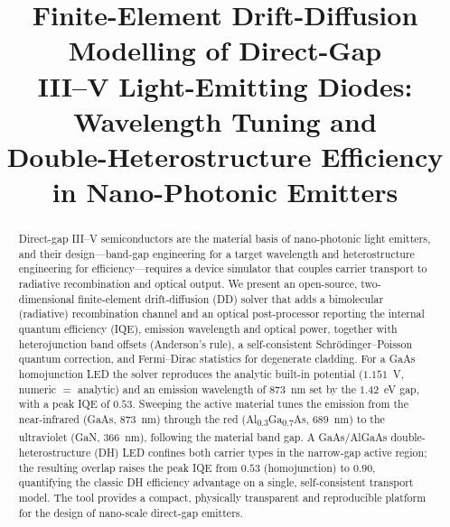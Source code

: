 \documentclass[conference]{IEEEtran}
\begin{document}
\title{Finite-Element Drift-Diffusion Modelling of Direct-Gap\\
III--V Light-Emitting Diodes: Wavelength Tuning and\\
Double-Heterostructure Efficiency in Nano-Photonic Emitters}

\author{%
}

\maketitle

\begin{abstract}
Direct-gap III--V semiconductors are the material basis of nano-photonic light
emitters, and their design---band-gap engineering for a target wavelength and
heterostructure engineering for efficiency---requires a device simulator that
couples carrier transport to radiative recombination and optical output. We
present an open-source, two-dimensional finite-element drift-diffusion (DD) solver
that adds a bimolecular (radiative) recombination channel and an optical
post-processor reporting the internal quantum efficiency (IQE), emission
wavelength and optical power, together with heterojunction band offsets
(Anderson's rule), a self-consistent Schr\"odinger--Poisson quantum correction,
and Fermi--Dirac statistics for degenerate cladding. For a GaAs homojunction LED
the solver reproduces the analytic built-in potential ($1.151$~V, numeric $=$
analytic) and an emission wavelength of $873$~nm set by the $1.42$~eV gap, with a
peak IQE of $0.53$. Sweeping the active material tunes the emission from the
near-infrared (GaAs, $873$~nm) through the red
(Al\textsubscript{0.3}Ga\textsubscript{0.7}As, $689$~nm) to the ultraviolet
(GaN, $366$~nm), following the material band gap. A GaAs/AlGaAs
double-heterostructure (DH) LED confines both carrier types in the narrow-gap
active region; the resulting overlap raises the peak IQE from $0.53$
(homojunction) to $0.90$, quantifying the classic DH efficiency advantage on a
single, self-consistent transport model. The tool provides a compact, physically
transparent and reproducible platform for the design of nano-scale direct-gap
emitters.
\end{abstract}
\end{document}
